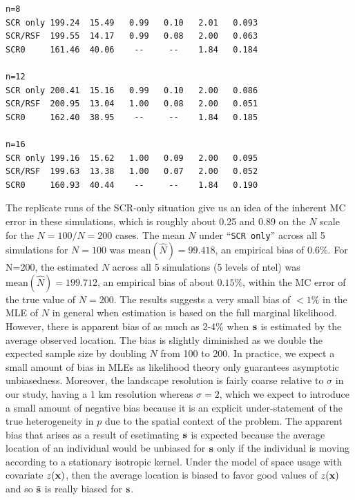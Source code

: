 {\begin{verbatim}
n=8
SCR only 199.24  15.49   0.99   0.10   2.01   0.093
SCR/RSF  199.55  14.17   0.99   0.08   2.00   0.063
SCR0     161.46  40.06    --     --    1.84   0.184

n=12
SCR only 200.41  15.16   0.99   0.10   2.00   0.086
SCR/RSF  200.95  13.04   1.00   0.08   2.00   0.051
SCR0     162.40  38.95    --     --    1.84   0.185

n=16
SCR only 199.16  15.62   1.00   0.09   2.00   0.095
SCR/RSF  199.63  13.38   1.00   0.07   2.00   0.052
SCR0     160.93  40.44    --     --    1.84   0.190
\end{verbatim}
}


The replicate runs of the SCR-only situation give us an idea of the
inherent MC error in these simulations, which is roughly about
0.25 and 0.89 on the $N$ scale for the $N=100/N=200$ cases.
 The mean $N$ under ``\mbox{\tt SCR only}''
across all 5 simulations for $N=100$ was $\mbox{mean}(\hat{N}) = 99.418$, an empirical bias of
$0.6\%$. For N=200, the estimated $N$ across all 5 simulations (5
levels of ntel)  was
$\mbox{mean}(\hat{N}) = 199.712$, an empirical bias of about $0.15\%$, within the MC error of
the true value of $N=200$.
The results suggests a very small bias of $< 1\%$
in the MLE of $N$ in general when estimation is based on the full
marginal likelihood. However, there is apparent bias of as much as 2-4\% when ${\bf s}$ is
estimated by the average observed location.
The bias is slightly
diminished  as we double the expected sample size by doubling $N$ from 100 to
200.
  In practice, we expect a
small amount of bias in MLEs as likelihood theory only guarantees
asymptotic unbiasedness.
 Moreover, the landscape resolution is fairly coarse relative
to $\sigma$ in our study, having a 1 km resolution whereas $\sigma =
2$, which we expect to introduce a small amount of negative bias
because it is an explicit under-statement of the true heterogeneity in
$p$ due to the spatial context of the problem.  The apparent bias that
arises as a result of esetimating ${\bf s}$ is expected because the
average location of an individual would be unbiased for ${\bf s}$ only
if the individual is moving according to a stationary isotropic
kernel. Under the model of space usage with covariate $z({\bf x})$,
then the average location is biased to favor good values of $z({\bf
  x})$ and so $\bar{\bf s}$ is really biased for ${\bf s}$.


